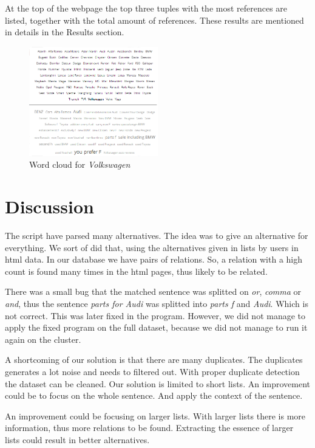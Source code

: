 \documentclass{sig-alternate}
\begin{document}
At the top of the webpage the top three tuples with the most references are listed, together with the total amount of references. These results are mentioned in details in the Results section.

\begin{figure}[t]
	\label{img:screenCars}
	\centering
		\includegraphics[width=0.5\textwidth]{screen_car_cloud.png}
		\caption{Word cloud for \emph{Volkswagen}}
\end{figure}

\section{Discussion}
The script have parsed many alternatives. The idea was to give an alternative for everything. We sort of did that, using the alternatives given in lists by users in html data. In our database we have pairs of relations. So, a relation with a high count is found many times in the html pages, thus likely to be related. 

There was a small bug that the matched sentence was splitted on \emph{or}, \emph{comma} or \emph{and}, thus the sentence \emph{parts for Audi} was splitted into \emph{parts f} and \emph{Audi}. Which is not correct. This was later fixed in the program. However, we did not manage to apply the fixed program on the full dataset, because we did not manage to run it again on the cluster. 

A shortcoming of our solution is that there are many duplicates. The duplicates generates a lot noise and needs to filtered out. With proper duplicate detection the dataset can be cleaned. Our solution is limited to short lists. An improvement could be to focus on the whole sentence. And apply the context of the sentence.

An improvement could be focusing on larger lists. With larger lists there is more information, thus more relations to be found. Extracting the essence of larger lists could result in better alternatives. 
\end{document}
